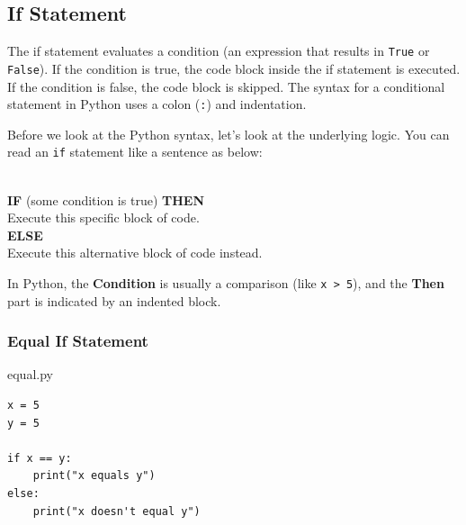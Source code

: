 \documentclass{report}
\begin{document}
\subsection{If Statement}
The if statement evaluates a condition (an expression that results in \texttt{True} or \texttt{False}). If the condition is true, the code block inside the if statement is executed. If the condition is false, the code block is skipped. The syntax for a conditional statement in Python uses a colon (\texttt{:}) and indentation.

Before we look at the Python syntax, let's look at the underlying logic. You can read an \texttt{if} statement like a sentence as below:
\\\\


\begin{logicbox}
    \textbf{IF} (some condition is true) \textbf{THEN} \\
    \hspace*{2em} Execute this specific block of code. \\
    \textbf{ELSE} \\
    \hspace*{2em} Execute this alternative block of code instead.
\end{logicbox}

In Python, the \textbf{Condition} is usually a comparison (like \texttt{x > 5}), and the \textbf{Then} part is indicated by an indented block.


\subsubsection*{Equal If Statement}
\begin{vscode}{equal.py}
\begin{lstlisting}[style=vscodeStyle]
x = 5
y = 5

if x == y:
    print("x equals y")
else:
    print("x doesn't equal y")
\end{lstlisting}
\end{vscode}
\end{document}
